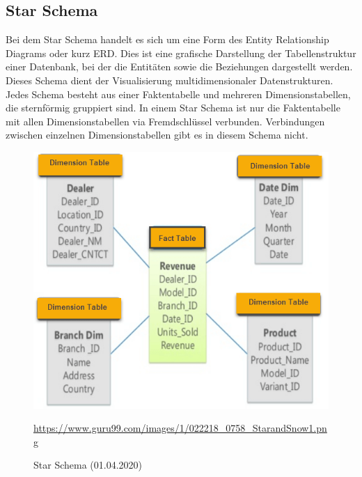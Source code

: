\subsection{Star Schema}\label{ssec:Star-Schema}
Bei dem Star Schema handelt es sich um eine Form des Entity Relationship Diagrams oder kurz ERD. Dies ist eine grafische Darstellung der Tabellenstruktur einer Datenbank, bei der die Entitäten sowie die Beziehungen dargestellt werden. Dieses Schema dient der Visualisierung multidimensionaler Datenstrukturen. Jedes Schema besteht aus einer Faktentabelle und mehreren Dimensionstabellen, die sternförmig gruppiert sind. In einem Star Schema ist nur die Faktentabelle mit allen Dimensionstabellen via Fremdschlüssel verbunden. Verbindungen zwischen einzelnen Dimensionstabellen gibt es in diesem Schema nicht.
\begin{figure}[H]
\centering
  \includegraphics[scale=0.4]{images/Star.png}
  \caption[Star Schema (01.04.2020)]{Star Schema (01.04.2020)}
  \url{https://www.guru99.com/images/1/022218_0758_StarandSnow1.png}
  \label{fig:Star-Schema}
\end{figure}
\newpage
